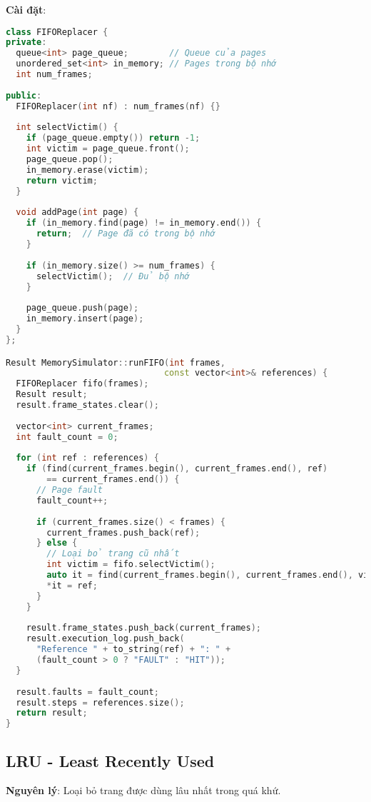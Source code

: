 \textbf{Cài đặt}:
\begin{lstlisting}[language=C++,caption={FIFO Page Replacement}]
class FIFOReplacer {
private:
  queue<int> page_queue;        // Queue của pages
  unordered_set<int> in_memory; // Pages trong bộ nhớ
  int num_frames;
  
public:
  FIFOReplacer(int nf) : num_frames(nf) {}
  
  int selectVictim() {
    if (page_queue.empty()) return -1;
    int victim = page_queue.front();
    page_queue.pop();
    in_memory.erase(victim);
    return victim;
  }
  
  void addPage(int page) {
    if (in_memory.find(page) != in_memory.end()) {
      return;  // Page đã có trong bộ nhớ
    }
    
    if (in_memory.size() >= num_frames) {
      selectVictim();  // Đủ bộ nhớ
    }
    
    page_queue.push(page);
    in_memory.insert(page);
  }
};

Result MemorySimulator::runFIFO(int frames, 
                               const vector<int>& references) {
  FIFOReplacer fifo(frames);
  Result result;
  result.frame_states.clear();
  
  vector<int> current_frames;
  int fault_count = 0;
  
  for (int ref : references) {
    if (find(current_frames.begin(), current_frames.end(), ref) 
        == current_frames.end()) {
      // Page fault
      fault_count++;
      
      if (current_frames.size() < frames) {
        current_frames.push_back(ref);
      } else {
        // Loại bỏ trang cũ nhất
        int victim = fifo.selectVictim();
        auto it = find(current_frames.begin(), current_frames.end(), victim);
        *it = ref;
      }
    }
    
    result.frame_states.push_back(current_frames);
    result.execution_log.push_back(
      "Reference " + to_string(ref) + ": " +
      (fault_count > 0 ? "FAULT" : "HIT"));
  }
  
  result.faults = fault_count;
  result.steps = references.size();
  return result;
}
\end{lstlisting}

\subsection{LRU - Least Recently Used}

\textbf{Nguyên lý}: Loại bỏ trang được dùng lâu nhất trong quá khứ.


